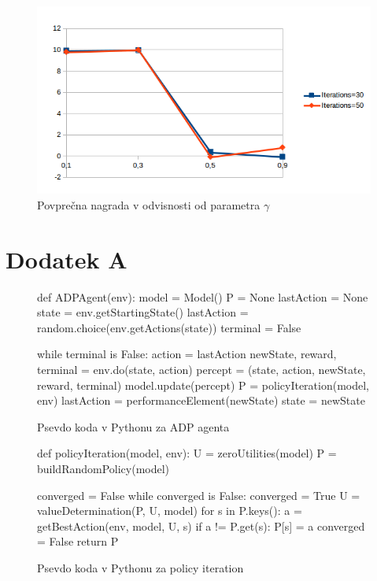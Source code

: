 \documentclass[a4paper]{article}
\begin{document}
\begin{figure}[H]
  \centering
  \includegraphics[width=1.0\textwidth]{graf.png}
  \caption{Povprečna nagrada v odvisnosti od parametra $\gamma$}
  \label{fig:res}
\end{figure}



\section{Dodatek A}
\label{koda}
\begin{figure}[H]
\begin{python}
def ADPAgent(env):
	model = Model()
	P = None
	lastAction = None
	state = env.getStartingState()
	lastAction = random.choice(env.getActions(state))
	terminal = False

	while terminal is False:
		action = lastAction
		newState, reward, terminal = env.do(state, action)
		percept = (state, action, newState, reward, terminal)
		model.update(percept)
		P = policyIteration(model, env)
		lastAction = performanceElement(newState)
		state = newState
\end{python}
\caption{Psevdo koda v Pythonu za ADP agenta}
\end{figure}

\begin{figure}[H]
\begin{python}
def policyIteration(model, env):
    U = zeroUtilities(model)
    P = buildRandomPolicy(model)	
   
    converged = False
    while converged is False:
        converged = True
        U = valueDetermination(P, U, model)
        for s in P.keys():
            a = getBestAction(env, model, U, s)
            if a != P.get(s):
                P[s] = a
                converged = False
    return P
\end{python}
\caption{Psevdo koda v Pythonu za policy iteration}
\end{figure}
\end{document}
